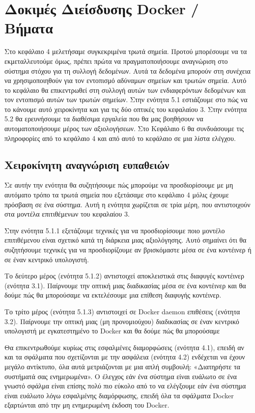 \chapter{Δοκιμές Διείσδυσης \textlatin{Docker} / Βήματα}
\label{dockerPenTesting}

Στο κεφάλαιο 4 μελετήσαμε συγκεκριμένα τρωτά σημεία. Προτού μπορέσουμε να τα
εκμεταλλευτούμε όμως, πρέπει πρώτα να πραγματοποιήσουμε αναγνώριση στο
σύστημα στόχου για τη συλλογή δεδομένων. Αυτά τα δεδομένα μπορούν στη συνέχεια
να χρησιμοποιηθούν για τον εντοπισμό αδύναμων σημείων και
τρωτών σημεία. Αυτό το κεφάλαιο θα επικεντρωθεί στη συλλογή αυτών των
ενδιαφερόντων δεδομένων και τον εντοπισμό αυτών των τρωτών σημείων.
Στην ενότητα 5.1 εστιάζουμε στο πώς να το κάνουμε αυτό χειροκίνητα και για τις
δύο οπτικές του κεφαλαίου 3. Στην ενότητα 5.2 θα ερευνήσουμε τα διαθέσιμα
εργαλεία που θα μας βοηθήσουν να αυτοματοποιήσουμε μέρος των αξιολογήσεων. Στο
Κεφάλαιο 6 θα συνδυάσουμε τις πληροφορίες από το κεφάλαιο 4 και από αυτό το
κεφάλαιο σε μια λίστα ελέγχου.

\section{Χειροκίνητη αναγνώριση ευπαθειών}

Σε αυτήν την ενότητα θα συζητήσουμε πώς μπορούμε να προσδιορίσουμε με μη
αυτόματο τρόπο τα τρωτά σημεία που εξετάσαμε στο κεφάλαιο 4 μόλις έχουμε
πρόσβαση σε ένα σύστημα. Αυτή η ενότητα χωρίζεται σε τρία μέρη, που
αντιστοιχούν στα μοντέλα επιτιθέμενων του κεφαλαίου 3.

Στην ενότητα 5.1.1 εξετάζουμε τεχνικές για να προσδιορίσουμε ποιο μοντέλο
επιτιθέμενου είναι σχετικό κατά τη διάρκεια μιας αξιολόγησης. Αυτό σημαίνει ότι
θα συζητήσουμε τεχνικές για να προσδιορίζουμε αν βρισκόμαστε μέσα σε ένα
κοντέινερ ή σε έναν κεντρικό υπολογιστή.

Το δεύτερο μέρος (ενότητα 5.1.2) αντιστοιχεί αποκλειστικά στις διαφυγές
κοντέινερ (ενότητα 3.1). Παίρνουμε την οπτική μιας διαδικασίας μέσα σε ένα
κοντέινερ και θα δούμε πώς θα μπορούσαμε να εκτελέσουμε μια επίθεση διαφυγής
κοντέινερ.

Το τρίτο μέρος (ενότητα 5.1.3) αντιστοιχεί σε \textlatin{Docker daemon}
επιθέσεις (ενότητα 3.2). Παίρνουμε την οπτική μιας (μη προνομιούχου) διαδικασίας
σε έναν κεντρικό υπολογιστή με εγκατεστημένο το \textlatin{Docker} και θα δούμε
πώς θα μπορούσαμε 

Θα επικεντρωθούμε κυρίως στις εσφαλμένες διαμορφώσεις (ενότητα 4.1), επειδή
αν και τα σφάλματα που σχετίζονται με την ασφάλεια (ενότητα 4.2) ενδέχεται να
έχουν μεγάλο αντίκτυπο, όλα αυτά μετριάζονται με μια απλή συμβουλή:
«Διατηρήστε τα συστήματά σας ενημερωμένα». Ο έλεγχος εάν ένα σύστημα είναι
ευάλωτο σε ένα γνωστό σφάλμα είναι επίσης πολύ πιο εύκολο από το να ελέγξουμε
εάν ένα σύστημα είναι ευάλωτο λόγω εσφαλμένης διαμόρφωσης, επειδή όλα τα
σφάλματα \textlatin{Docker} εξαρτώνται από την μη ενημερωμένη έκδοση του
\textlatin{Docker}.

